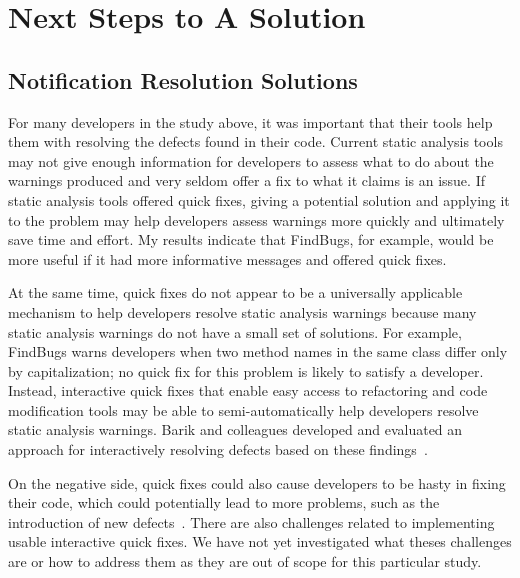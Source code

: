 \section{Next Steps to A Solution}

\subsection{Notification Resolution Solutions}

For many developers in the study above, it was important that their tools help them with resolving the defects found in their code.
Current static analysis tools may not give enough information for
developers to assess what to do about the warnings produced and very seldom
offer a fix to what it claims is an issue. If static analysis tools offered
quick fixes, giving a potential solution and applying it to the problem may help
developers assess warnings more quickly and ultimately save time and effort. My
results indicate that FindBugs, for example, would be more useful if it had more
informative messages and offered quick fixes. 

At the same time, quick fixes do not appear to be a universally applicable mechanism to help
developers resolve static analysis warnings because many static analysis
warnings do not have a small set of solutions. For example, FindBugs warns
developers when two method names in the same class differ only by
capitalization; no quick fix for this problem is likely to satisfy a developer.
Instead, interactive quick fixes that enable easy access to refactoring and code
modification tools may be able to semi-automatically help developers resolve
static analysis warnings. Barik and colleagues developed and evaluated an approach for interactively resolving defects based on these findings~\cite{barik2016quick}.

On the negative side, quick fixes could also cause
developers to be hasty in fixing their code, which could potentially lead to
more problems, such as the introduction of new defects~\cite{Mucslu:2012:Speculative}. There are also
challenges related to implementing usable interactive quick fixes. We
have not yet investigated what theses challenges are or how to address them as
they are out of scope for this particular study.


